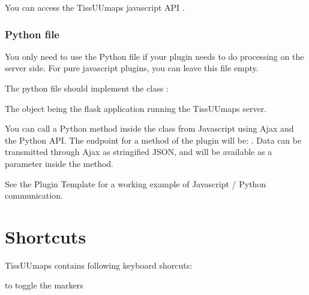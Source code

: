 \documentclass[letterpaper,10pt,english,openany,oneside]{sphinxmanual}
\begin{document}
\sphinxAtStartPar
You can access the TissUUmaps javascript API .


\subsubsection{Python file}
\label{\detokenize{docs/starting/plugins:python-file}}
\sphinxAtStartPar
You only need to use the Python file if your plugin needs to do processing on the server side. For pure javascript plugins, you can leave this file empty.

\sphinxAtStartPar
The python file should implement the class :

\begin{sphinxVerbatim}[commandchars=\\\{\}]
  
      
          
\end{sphinxVerbatim}

\sphinxAtStartPar
The  object being the flask application running the TissUUmaps server.

\sphinxAtStartPar
You can call a Python method inside the  class from Javascript using Ajax and the Python API. The endpoint for a method  of the plugin  will be: . Data can be transmitted through Ajax as stringified JSON, and will be available as a parameter inside the method.

\sphinxAtStartPar
See the Plugin Template for a working example of Javascript / Python communication.

\sphinxstepscope


\section{Shortcuts}
\label{\detokenize{docs/starting/shortcuts:shortcuts}}\label{\detokenize{docs/starting/shortcuts::doc}}
\sphinxAtStartPar
TissUUmaps contains following keyboard shorcuts:

\sphinxAtStartPar
{} \sphinxhyphen{} to toggle the markers
\end{document}
